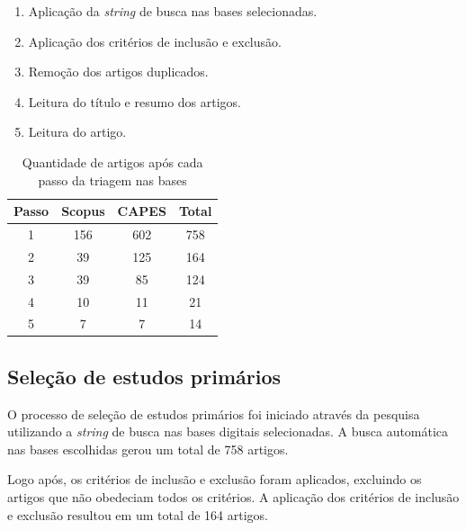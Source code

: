 \begin{enumerate}
	\item Aplicação da \textit{string} de busca nas bases selecionadas. %
	
	\item Aplicação dos critérios de inclusão e exclusão. %
	
	\item Remoção dos artigos duplicados. %
	
	\item Leitura do título e resumo dos artigos. %
	
	\item Leitura do artigo. %
\end{enumerate} 

\begin{table}[h!]
	\centering
	\label{tab:triagem}
	\begin{tabular}{|c|c|c|c|}
		\hline
		\textbf{Passo} & \textbf{Scopus} & \textbf{CAPES} & \textbf{Total} \\ \hline
		1 & 156 & 602 & 758\\ \hline
		2 & 39 & 125 & 164\\ \hline
		3 & 39 & 85 & 124\\ \hline
		4 & 10 & 11 & 21\\ \hline
		5 & 7 & 7 & 14\\ \hline
	\end{tabular}
	\caption{Quantidade de artigos após cada passo da triagem nas bases}
\end{table}


\subsection{Seleção de estudos primários}

O processo de seleção de estudos primários foi iniciado através da pesquisa utilizando a \textit{string} de busca nas bases digitais selecionadas. A busca automática nas bases escolhidas gerou um total de 758 artigos.

Logo após, os critérios de inclusão e exclusão foram aplicados, excluindo os artigos que não obedeciam todos os critérios. A aplicação dos critérios de inclusão e exclusão resultou em um total de 164 artigos.


